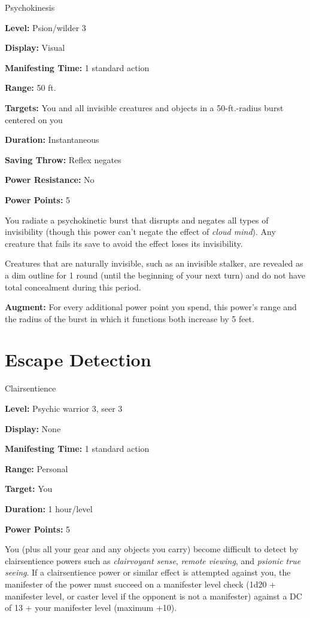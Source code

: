 \documentclass{article}
\begin{document}
Psychokinesis

\textbf{Level:} Psion/wilder 3

\textbf{Display:} Visual

\textbf{Manifesting Time:} 1 standard action

\textbf{Range:} 50 ft.

\textbf{Targets:} You and all invisible creatures and objects in a 50-ft.-radius 
burst centered on you

\textbf{Duration:} Instantaneous

\textbf{Saving Throw:} Reflex negates

\textbf{Power Resistance:} No

\textbf{Power Points:} 5

You radiate a psychokinetic burst that disrupts and negates all types of invisibility 
(though this power can't negate the effect of \textit{cloud mind}). Any creature 
that fails its save to avoid the effect loses its invisibility.

Creatures that are naturally invisible, such as an invisible stalker, are revealed 
as a dim outline for 1 round (until the beginning of your next turn) and do not 
have total concealment during this period.

\textbf{Augment:} For every additional power point you spend, this power's range 
and the radius of the burst in which it functions both increase by 5 feet.

\vspace{12pt}
\section*{Escape Detection}

Clairsentience

\textbf{Level:} Psychic warrior 3, seer 3

\textbf{Display:} None

\textbf{Manifesting Time:} 1 standard action

\textbf{Range:} Personal

\textbf{Target:} You

\textbf{Duration:} 1 hour/level

\textbf{Power Points:} 5

You (plus all your gear and any objects you carry) become difficult to detect by 
clairsentience powers such as \textit{clairvoyant sense}, \textit{remote viewing}, 
and \textit{psionic true seeing}. If a clairsentience power or similar effect is 
attempted against you, the manifester of the power must succeed on a manifester 
level check (1d20 + manifester level, or caster level if the opponent is not a 
manifester) against a DC of 13 + your manifester level (maximum +10).
\end{document}
